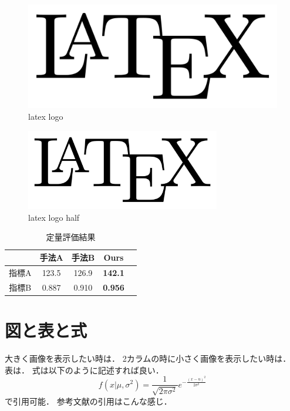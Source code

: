\begin{figure}[t]
\centering
    \includegraphics[width=\textwidth]{./figs/latex_logo.png}
    \caption{latex logo}
    \label{fig:latex_logo}
\end{figure}

\begin{figure}[t]
  \begin{center}
    \includegraphics[width=8.5cm]{figs/latex_logo.png}
    \caption{latex logo half}
    \label{fig:latex_logo_half}
  \end{center}
\end{figure}

\begin{table}[t]
    \centering
\caption{定量評価結果}
\label{tab:quantitative_eval}
\begin{tabular}{ccccc}
    \toprule
& 手法A & 手法B & Ours \\
    \midrule
指標A & 123.5 & 126.9 & {\bf 142.1} \\
指標B & 0.887 & 0.910 & {\bf 0.956} \\
\bottomrule
\end{tabular}
\end{table}

\section{図と表と式}
大きく画像を表示したい時は．
2カラムの時に小さく画像を表示したい時は．
表は．
式は以下のように記述すれば良い．
\begin{equation}
\label{eq:gauss}
f(x | \mu, \sigma^2) = \frac{1}{\sqrt{2 \pi \sigma^2}} e^{-\frac{(x - u)^2}{2 \sigma^2}}
\end{equation}
で引用可能．
参考文献の引用はこんな感じ\cite{goodfellow2014generative}．